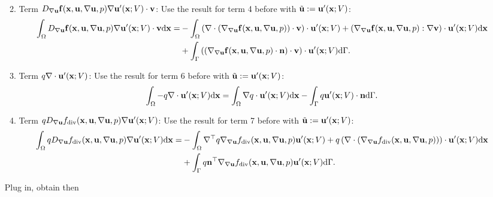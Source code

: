 \documentclass[oneside,11pt]{book}
\numberwithin{equation}{section}
\begin{document}
\begin{enumerate}[leftmargin=0in]
\begin{enumerate}[leftmargin=0in]
\begin{align*}
        \end{align*}
        \item Term $D_{\nabla{\bf u}}{\bf f}({\bf x},{\bf u},\nabla{\bf u},p)\nabla{\bf u}'({\bf x};V)\cdot{\bf v}$: Use the result for term 4 before with $\tilde{\bf u} := {\bf u}'({\bf x};V)$:
        \begin{align*}
            \int_\Omega D_{\nabla{\bf u}}{\bf f}({\bf x},{\bf u},\nabla{\bf u},p)\nabla{\bf u}'({\bf x};V)\cdot{\bf v}{\rm d}{\bf x} =& -\int_\Omega \left(\nabla\cdot\left(\nabla_{\nabla{\bf u}}{\bf f}({\bf x},{\bf u},\nabla{\bf u},p)\right)\cdot{\bf v}\right)\cdot{\bf u}'({\bf x};V) + \left(\nabla_{\nabla{\bf u}}{\bf f}({\bf x},{\bf u},\nabla{\bf u},p):\nabla{\bf v}\right)\cdot{\bf u}'({\bf x};V){\rm d}{\bf x}\\
            &+ \int_\Gamma \left(\left(\nabla_{\nabla{\bf u}}{\bf f}({\bf x},{\bf u},\nabla{\bf u},p)\cdot{\bf n}\right)\cdot{\bf v}\right)\cdot{\bf u}'({\bf x};V){\rm d}\Gamma.
        \end{align*}
        \item Term $q\nabla\cdot{\bf u}'({\bf x};V)$: Use the result for term 6 before with $\tilde{\bf u} := {\bf u}'({\bf x};V)$:
        \begin{align*}
            \int_\Omega -q\nabla\cdot{\bf u}'({\bf x};V){\rm d}{\bf x} = \int_\Omega \nabla q\cdot{\bf u}'({\bf x};V){\rm d}{\bf x} - \int_\Gamma q{\bf u}'({\bf x};V)\cdot{\bf n}{\rm d}\Gamma.
        \end{align*}
        \item Term $qD_{\nabla{\bf u}}f_{\rm div}({\bf x},{\bf u},\nabla{\bf u},p)\nabla{\bf u}'({\bf x};V)$: Use the result for term 7 before with $\tilde{\bf u} := {\bf u}'({\bf x};V)$:
        \begin{align*}
            \int_\Omega qD_{\nabla{\bf u}}f_{\rm div}({\bf x},{\bf u},\nabla{\bf u},p)\nabla{\bf u}'({\bf x};V){\rm d}{\bf x} =& -\int_\Omega \nabla^\top q\nabla_{\nabla{\bf u}}f_{\rm div}({\bf x},{\bf u},\nabla{\bf u},p){\bf u}'({\bf x};V) + q\left(\nabla\cdot\left(\nabla_{\nabla{\bf u}}f_{\rm div}({\bf x},{\bf u},\nabla{\bf u},p)\right)\right)\cdot{\bf u}'({\bf x};V){\rm d}{\bf x}\\
            &+ \int_\Gamma q{\bf n}^\top\nabla_{\nabla{\bf u}}f_{\rm div}({\bf x},{\bf u},\nabla{\bf u},p){\bf u}'({\bf x};V){\rm d}\Gamma.
        \end{align*}
    \end{enumerate}
    Plug in, obtain then
    \begin{equation*}

\end{equation*}
\end{enumerate}
\end{document}
